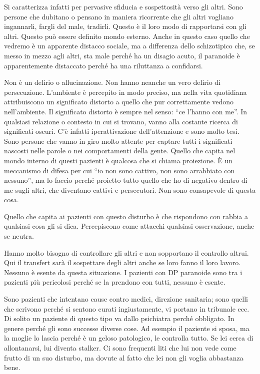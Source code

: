 Si caratterizza infatti per pervasive sfiducia e sospettosità verso gli
altri. Sono persone che dubitano o pensano in maniera ricorrente che gli
altri vogliano ingannarli, fargli del male, tradirli. Questo è il loro
modo di rapportarsi con gli altri. Questo può essere definito mondo
esterno. Anche in questo caso quello che vedremo è un apparente distacco
sociale, ma a differenza dello schizotipico che, se messo in mezzo agli
altri, sta male perché ha un disagio acuto, il paranoide è
apparentemente distaccato perché ha una riluttanza a confidarsi.

Non è un delirio o allucinazione. Non hanno neanche un vero delirio di
persecuzione. L'ambiente è percepito in modo preciso, ma nella vita
quotidiana attribuiscono un significato distorto a quello che pur
correttamente vedono nell'ambiente. Il significato distorto è sempre nel
senso: ``ce l'hanno con me''. In qualsiasi relazione o contesto in cui
si trovano, vanno alla costante ricerca di significati oscuri. C'è
infatti iperattivazione dell'attenzione e sono molto tesi. Sono persone
che vanno in giro molto attente per captare tutti i significati nascosti
nelle parole o nei comportamenti della gente. Quello che capita nel
mondo interno di questi pazienti è qualcosa che si chiama proiezione. È
un meccanismo di difesa per cui ``io non sono cattivo, non sono
arrabbiato con nessuno'', ma lo faccio perché proietto tutto quello che
ho di negativo dentro di me sugli altri, che diventano cattivi e
persecutori. Non sono consapevole di questa cosa.

Quello che capita ai pazienti con questo disturbo è che rispondono con
rabbia a qualsiasi cosa gli si dica. Percepiscono come attacchi
qualsiasi osservazione, anche se neutra.

Hanno molto bisogno di controllare gli altri e non sopportano il
controllo altrui. Qui il transfert sarà il sospettare degli altri anche
se loro fanno il loro lavoro. Nessuno è esente da questa situazione. I
pazienti con DP paranoide sono tra i pazienti più pericolosi perché se
la prendono con tutti, nessuno è esente.

Sono pazienti che intentano cause contro medici, direzione sanitaria;
sono quelli che scrivono perché si sentono curati ingiustamente, vi
portano in tribunale ecc. Di solito un paziente di questo tipo va dallo
psichiatra perché obbligato. In genere perché gli sono successe diverse
cose. Ad esempio il paziente si sposa, ma la moglie lo lascia perché è
un geloso patologico, le controlla tutto. Se lei cerca di allontanarsi,
lui diventa stalker. Ci sono frequenti liti che lui non vede come frutto
di un suo disturbo, ma dovute al fatto che lei non gli voglia abbastanza
bene.

